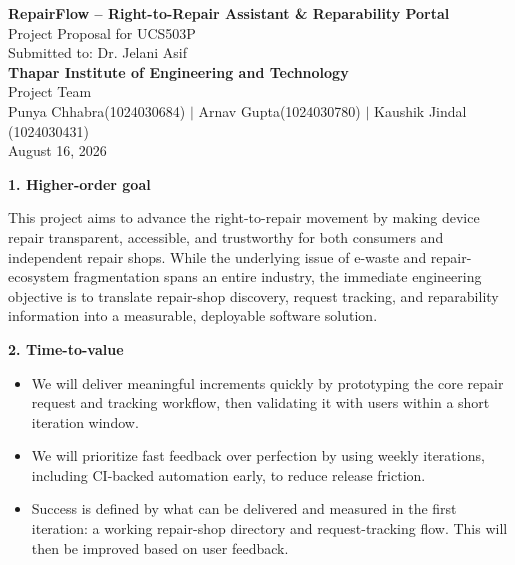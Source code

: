 \documentclass[11pt]{article}
\newcommand{\sechead}[2]{%
  \vspace{0.35cm}\noindent
  {\large\bfseries #1}\hfill{\large\itshape #2}\par
  \vspace{0.15cm}
}
\begin{document}
\begin{center}
{\LARGE\bfseries RepairFlow -- Right-to-Repair Assistant \& Reparability Portal}\\[6pt]
Project Proposal for UCS503P\\
Submitted to: Dr. Jelani Asif\\
\textbf{Thapar Institute of Engineering and Technology}\\[10pt]
Project Team\\
Punya Chhabra(1024030684) $\vert$ Arnav Gupta(1024030780) $\vert$ Kaushik Jindal (1024030431)\\[10pt]
August 16, 2026
\end{center}

\vspace{0.4cm}

\sechead{1. Higher-order goal}{}
This project aims to advance the right-to-repair movement by making device repair transparent, accessible, and trustworthy for both consumers and independent repair shops. While the underlying issue of e-waste and repair-ecosystem fragmentation spans an entire industry, the immediate engineering objective is to translate repair-shop discovery, request tracking, and reparability information into a measurable, deployable software solution.

\sechead{2. Time-to-value}{}
\begin{itemize}
  \item We will deliver meaningful increments quickly by prototyping the core repair request and tracking workflow, then validating it with users within a short iteration window.
  \item We will prioritize fast feedback over perfection by using weekly iterations, including CI-backed automation early, to reduce release friction.
  \item Success is defined by what can be delivered and measured in the first iteration: a working repair-shop directory and request-tracking flow. This will then be improved based on user feedback.
\end{itemize}
\end{document}
